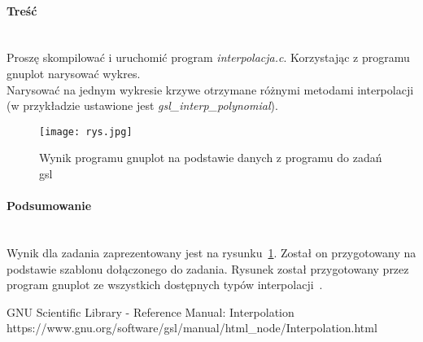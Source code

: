 \paragraph{Treść}~\\
Proszę skompilować i uruchomić program \textit{interpolacja.c}.
Korzystając z programu gnuplot narysować wykres.\\
Narysować na jednym wykresie krzywe otrzymane różnymi metodami interpolacji (w przykładzie ustawione jest \textit{gsl\_interp\_polynomial}).



\begin{figure}[h]
  \caption{Wynik programu gnuplot na podstawie danych z programu do zadań gsl}
  \label{fig:WynikProgramuGnuplotNaPodstawieDanychZProgramuDoZadanGsl}
  \centering
  \texttt{[image: rys.jpg]}
\end{figure}

\paragraph{Podsumowanie}~\\
Wynik dla zadania zaprezentowany jest na rysunku~\ref{fig:WynikProgramuGnuplotNaPodstawieDanychZProgramuDoZadanGsl}.
Został on przygotowany na podstawie szablonu dołączonego do zadania.
Rysunek został przygotowany przez program gnuplot ze wszystkich dostępnych typów interpolacji~\cite{GslManualInterpolation}.

\begin{thebibliography}{9}
   GNU Scientific Library - Reference Manual: Interpolation https://www.gnu.org/software/gsl/manual/html\_node/Interpolation.html
\end{thebibliography}
